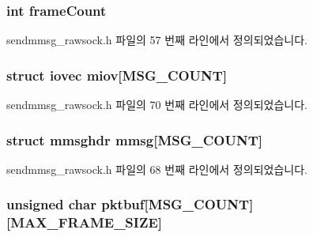 \subsubsection[{\texorpdfstring{frame\+Count}{frameCount}}]{\setlength{\rightskip}{0pt plus 5cm}int frame\+Count}\hypertarget{structsendmmsg__rawsock__t_abaf7d77bd2fc7eb6125fa605bd645b67}{}\label{structsendmmsg__rawsock__t_abaf7d77bd2fc7eb6125fa605bd645b67}


sendmmsg\+\_\+rawsock.\+h 파일의 57 번째 라인에서 정의되었습니다.

\subsubsection[{\texorpdfstring{miov}{miov}}]{\setlength{\rightskip}{0pt plus 5cm}struct iovec miov\mbox{[}{\bf M\+S\+G\+\_\+\+C\+O\+U\+NT}\mbox{]}}\hypertarget{structsendmmsg__rawsock__t_af6a33764c240d3fc43bebf771c1d86f0}{}\label{structsendmmsg__rawsock__t_af6a33764c240d3fc43bebf771c1d86f0}


sendmmsg\+\_\+rawsock.\+h 파일의 70 번째 라인에서 정의되었습니다.

\subsubsection[{\texorpdfstring{mmsg}{mmsg}}]{\setlength{\rightskip}{0pt plus 5cm}struct mmsghdr mmsg\mbox{[}{\bf M\+S\+G\+\_\+\+C\+O\+U\+NT}\mbox{]}}\hypertarget{structsendmmsg__rawsock__t_a1ead7275d486440c363373a4eb650597}{}\label{structsendmmsg__rawsock__t_a1ead7275d486440c363373a4eb650597}


sendmmsg\+\_\+rawsock.\+h 파일의 68 번째 라인에서 정의되었습니다.

\subsubsection[{\texorpdfstring{pktbuf}{pktbuf}}]{\setlength{\rightskip}{0pt plus 5cm}unsigned char pktbuf\mbox{[}{\bf M\+S\+G\+\_\+\+C\+O\+U\+NT}\mbox{]}\mbox{[}{\bf M\+A\+X\+\_\+\+F\+R\+A\+M\+E\+\_\+\+S\+I\+ZE}\mbox{]}}\hypertarget{structsendmmsg__rawsock__t_af18aae0e23cde1425d996e84b62c8829}{}\label{structsendmmsg__rawsock__t_af18aae0e23cde1425d996e84b62c8829}


